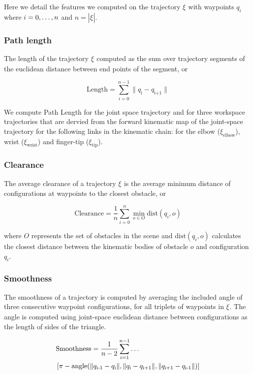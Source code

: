 \documentclass[letterpaper, 10 pt, conference]{ieeeconf}  %
\newcommand{\tj}[1]{\ensuremath{\xi_\text{#1}}}
\begin{document}
Here we detail the features we computed on the trajectory \tj{} with waypoints $q_i$ where $i={0,\mathellipsis,n}$ and $n=|\tj{}|$.

\subsubsection{Path length}

The length of the trajectory \tj{} computed as the sum over trajectory segments of the euclidean distance between end points of the segment, or

\begin{equation}
\text{Length} = \sum_{i=0}^{n-1} \| q_\text{i}-q_\text{i+1} \|
\end{equation}

We compute Path Length for the joint space trajectory and for three workspace trajectories that are dervied from the forward kinematic map of the joint-space trajectory for the following links in the kinematic chain: for the elbow ($\xi_\text{elbow}$), wrist ($\xi_\text{wrist}$) and finger-tip ($\xi_\text{tip}$).

\subsubsection{Clearance}

The average clearance of a trajectory \tj{} is the average minimum distance of configurations at waypoints to the closest obstacle, or

\begin{equation}
\text{Clearance} = \frac{1}{n} \sum_{i=0}^n \min_{o \in O} \text{dist}(q_i, o)
\end{equation}

where $O$ represents the set of obstacles in the scene and $\text{dist}(q_i, o)$ calculates the closest distance between the kinematic bodies of obstacle $o$ and configuration $q_i$.

\subsubsection{Smoothness}

The smoothness of a trajectory is computed by averaging the included angle of three consecutive waypoint configurations, for all triplets of waypoints in \tj{}. The angle is computed using joint-space euclidean distance between configurations as the length of sides of the triangle.

\begin{equation}
\begin{aligned}
&\text{Smoothness} = \frac{1}{n-2} \sum_{i=1}^{n-1} \mathellipsis\\
&\left[ \pi- \text{angle}(\|q_\text{i-1}-q_\text{i}\|,\|q_\text{i}-q_\text{i+1}\|,\|q_\text{i+1}-q_\text{i-1}\|) \right]\\
\end{aligned}
\end{equation}
\end{document}
